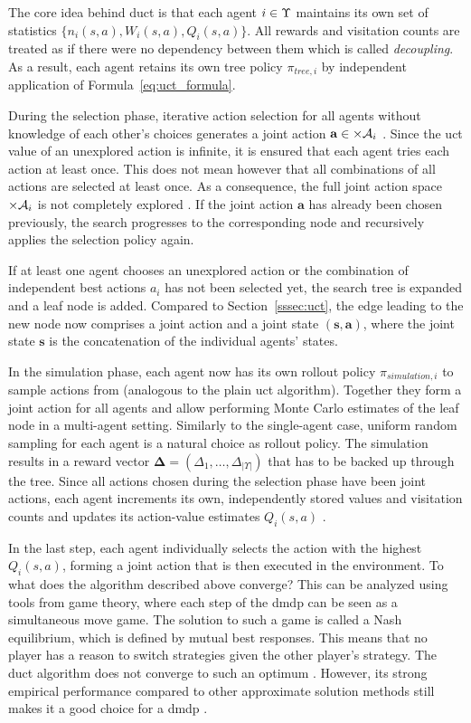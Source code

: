 The core idea behind \gls{duct} is that each agent $i \in\agentset$ maintains its own set of statistics $\{n_i(s, a), W_i(s, a), Q_i(s, a) \}$. All rewards and visitation counts are treated as if there were no dependency between them which is called \emph{decoupling}. As a result, each agent retains its own tree policy $\pi_{tree, i}$ by independent application of Formula~\ref{eq:uct_formula}.

During the selection phase, iterative action selection for all agents without knowledge of each other's choices generates a joint action $\mathbf a \in \times \actionspace_i$ \cite{takMonteCarloTree2014}. Since the \gls{uct} value of an unexplored action is infinite, it is ensured that each agent tries each action at least once. This does not mean however that all combinations of all actions are selected at least once. As a consequence, the full joint action space $\times \actionspace_i$ is not completely explored \cite{takMonteCarloTree2014}. If the joint action $\mathbf a$ has already been chosen previously, the search progresses to the corresponding node and recursively applies the selection policy again.

If at least one agent chooses an unexplored action or the combination of independent best actions $a_i$ has not been selected yet, the search tree is expanded and a leaf node is added. Compared to Section~\ref{sssec:uct}, the edge leading to the new node now comprises a joint action and a joint state $(\mathbf s, \mathbf a)$, where the joint state $\mathbf s$ is the concatenation of the individual agents' states.

In the simulation phase, each agent now has its own rollout policy $\pi_{simulation, i}$ to sample actions from (analogous to the plain \gls{uct} algorithm). Together they form a joint action for all agents and allow performing Monte Carlo estimates of the leaf node in a multi-agent setting. Similarly to the single-agent case, uniform random sampling for each agent is a natural choice as rollout policy. The simulation  results in a reward vector $\bm \Delta = (\Delta_1, \ldots, \Delta_{|\Upsilon|})$ that has to be backed up through the tree. Since all actions chosen during the selection phase have been joint actions, each agent increments its own, independently stored values and visitation counts and updates its action-value estimates $Q_i(s, a)$ \cite{takMonteCarloTree2014}.

In the last step, each agent individually selects the action with the highest $Q_i(s, a)$, forming a joint action that is then executed in the environment. To what does the algorithm described above converge? This can be analyzed using tools from game theory, where each step of the \gls{dmdp} can be seen as a simultaneous move game. The solution to such a game is called a Nash equilibrium, which is defined by mutual best responses. This means that no player has a reason to switch strategies given the other player's strategy. The \gls{duct} algorithm does not converge to such an optimum \cite{takMonteCarloTree2014}. However, its strong empirical performance compared to other approximate solution methods still makes it a good choice for a \gls{dmdp} \cite{takMonteCarloTree2014, lanctotMonteCarloTree}.


